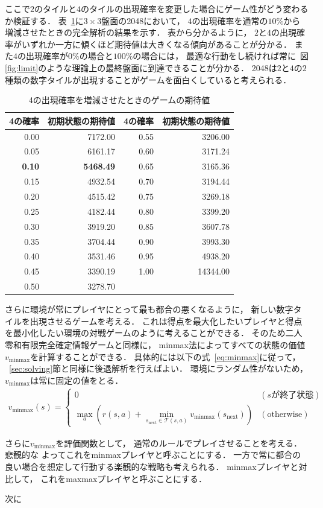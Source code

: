 ここで$2$のタイルと$4$のタイルの出現確率を変更した場合にゲーム性がどう変わるか検証する．
表~\ref{table: value_table}に$3 \times 3$盤面の2048において， $4$の出現確率を通常の$10\%$から増減させたときの完全解析の結果を示す．
表から分かるように， $2$と$4$の出現確率がいずれか一方に傾くほど期待値は大きくなる傾向があることが分かる．
また$4$の出現確率が$0\%$の場合と$100\%$の場合には， 最適な行動をし続ければ常に~図\ref{fig:limit}のような理論上の最終盤面に到達できることが分かる．
2048は$2$と$4$の$2$種類の数字タイルが出現することがゲームを面白くしていると考えられる．
\begin{table}[t]
\caption{4の出現確率を増減させたときのゲームの期待値}
\label{table: value_table}
\centering
\begin{tabular}{r|r||r|r}
    \hline 
    4の確率 & 初期状態の期待値 & 4の確率 & 初期状態の期待値 \\ \hline \hline
    0.00 & 7172.00 & 0.55 & 3206.00 \\
    0.05 & 6161.17 & 0.60 & 3171.24 \\
    \textbf{0.10} & \textbf{5468.49} & 0.65 & 3165.36 \\
    0.15 & 4932.54 & 0.70 & 3194.44 \\
    0.20 & 4515.42 & 0.75 & 3269.18 \\
    0.25 & 4182.44 & 0.80 & 3399.20 \\
    0.30 & 3919.20 & 0.85 & 3607.78 \\
    0.35 & 3704.44 & 0.90 & 3993.30 \\
    0.40 & 3531.46 & 0.95 & 4938.20 \\
    0.45 & 3390.19 & 1.00 & 14344.00 \\
    0.50 & 3278.70 &  & \\
    \hline
\end{tabular}
\end{table}

さらに環境が常にプレイヤにとって最も都合の悪くなるように， 新しい数字タイルを出現させるゲームを考える．
これは得点を最大化したいプレイヤと得点を最小化したい環境の対戦ゲームのように考えることができる．
そのため二人零和有限完全確定情報ゲームと同様に， minmax法によってすべての状態の価値$v_{\text{minmax}}$を計算することができる．
具体的には以下の式~\ref{eq:minmax}に従って， ~\ref{sec:solving}節と同様に後退解析を行えばよい．
環境にランダム性がないため， $v_{\text{minmax}}$は常に固定の値をとる．
\begin{align}
    v_{\text{minmax}}(s) =
    \begin{cases}
        0 & (s \text{が終了状態}) \\
        \max_a \left(r(s,a) + \min_{s_\text{next} \in \mathcal{T}(s,a)} v_{\text{minmax}}(s_\text{next}) \right) & (\text{otherwise})
    \end{cases}
    \label{eq:minmax}
\end{align}

さらに$v_{\text{minmax}}$を評価関数として， 通常のルールでプレイさせることを考える．
悲観的な
よってこれをminmaxプレイヤと呼ぶことにする．
一方で常に都合の良い場合を想定して行動する楽観的な戦略も考えられる．
minmaxプレイヤと対比して， これをmaxmaxプレイヤと呼ぶことにする．

次に